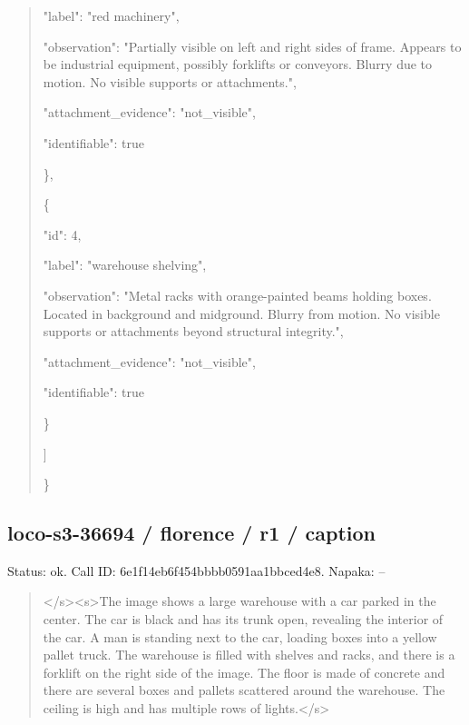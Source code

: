 \documentclass[10pt,a4paper]{article}
\begin{document}
\begin{quote}
      "label":\allowbreak{} "red machinery",\allowbreak{}\par
      "observation":\allowbreak{} "Partially visible on left and right sides of frame. Appears to be industrial equipment,\allowbreak{} possibly forklifts or conveyors. Blurry due to motion. No visible supports or attachments.",\allowbreak{}\par
      "attachment\_evidence":\allowbreak{} "not\_visible",\allowbreak{}\par
      "identifiable":\allowbreak{} true\par
    \},\allowbreak{}\par
    \{\par
      "id":\allowbreak{} 4,\allowbreak{}\par
      "label":\allowbreak{} "warehouse shelving",\allowbreak{}\par
      "observation":\allowbreak{} "Metal racks with orange-painted beams holding boxes. Located in background and midground. Blurry from motion. No visible supports or attachments beyond structural integrity.",\allowbreak{}\par
      "attachment\_evidence":\allowbreak{} "not\_visible",\allowbreak{}\par
      "identifiable":\allowbreak{} true\par
    \}\par
  ]\par
\}
\end{quote}
\subsection*{loco-s3-36694 / florence / r1 / caption}
Status: ok. Call ID: 6e1f14eb6f454bbbb0591aa1bbced4e8. Napaka: --
\begin{quote}\footnotesize
</s>\allowbreak{}<s>\allowbreak{}The image shows a large warehouse with a car parked in the center. The car is black and has its trunk open,\allowbreak{} revealing the interior of the car. A man is standing next to the car,\allowbreak{} loading boxes into a yellow pallet truck. The warehouse is filled with shelves and racks,\allowbreak{} and there is a forklift on the right side of the image. The floor is made of concrete and there are several boxes and pallets scattered around the warehouse. The ceiling is high and has multiple rows of lights.</s>\allowbreak{}
\end{quote}
\end{document}
